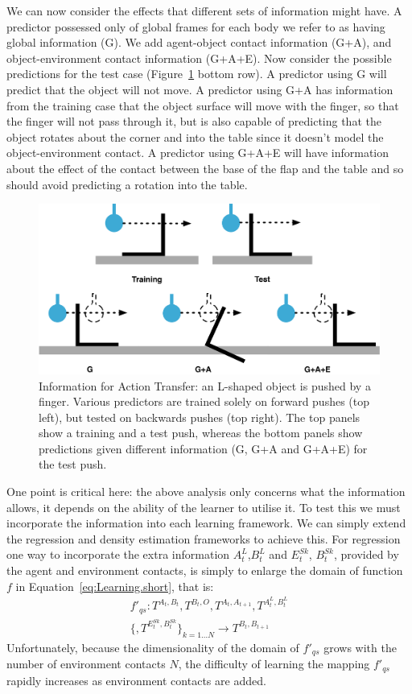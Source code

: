 We can now consider the effects that different sets of information might have. A predictor possessed only
of global frames for each body we refer to as having global information (G). We add agent-object contact
information (G+A), and object-environment contact information (G+A+E). Now consider the possible predictions for the test case (Figure~\ref{fig:ToyExample} bottom row). A predictor using G will predict that the object will not move. A predictor using G+A has information from the training case that the object surface will move with the finger, so that the finger will not pass through it, but is also capable of predicting that the object rotates about the corner and into the table since it doesn't model the object-environment contact. A predictor using G+A+E will have information about the effect of the contact between the base of the flap and the table and so should avoid predicting a rotation into the table.
\begin{figure}[b]
\centerline{\includegraphics[width=\columnwidth]{BackPushToyExample}}
\caption[ToyExample]{Information for Action Transfer: an L-shaped object is pushed by a finger. Various predictors are trained solely on forward pushes (top left), but tested on backwards pushes (top right). The top panels show a training and a test push, whereas the bottom panels show predictions given different information (G, G+A and G+A+E) for the test push.}
\label{fig:ToyExample}
\end{figure}
One point is critical here: the above analysis only concerns what the information allows, it depends on the ability of the learner to
utilise it.  To test this we must incorporate the information into each learning framework. We can simply extend the regression and density
estimation frameworks to achieve this. For regression one way to incorporate the extra information $A^{L}_{t}$,$B^{L}_{t}$ and
$E^{Sk}_t$\hspace{-6pt}, $B^{Sk}_t$, provided by the agent and environment contacts, is simply to enlarge the domain of function~$f$
in Equation~\eqref{eq:Learning.short}, that is:
\begin{multline}
f'_{qs}: T^{A_t, B_t}, T^{B_t, O}, T^{A_{t}, A_{t+1}}, T^{A^{L}_t, B^{L}_t} \\ \{, T^{E^{Sk}_t,B^{Sk}_t}\}_{k=1 \ldots N} \longrightarrow T^{B_{t}, B_{t+1}}
\label{eq:Learning.augmented}
\end{multline}
\noindent Unfortunately, because the dimensionality of the domain of $f'_{qs}$ grows with the number of environment contacts $N$,
the difficulty of learning the mapping $f'_{qs}$ rapidly increases as environment contacts are added.

